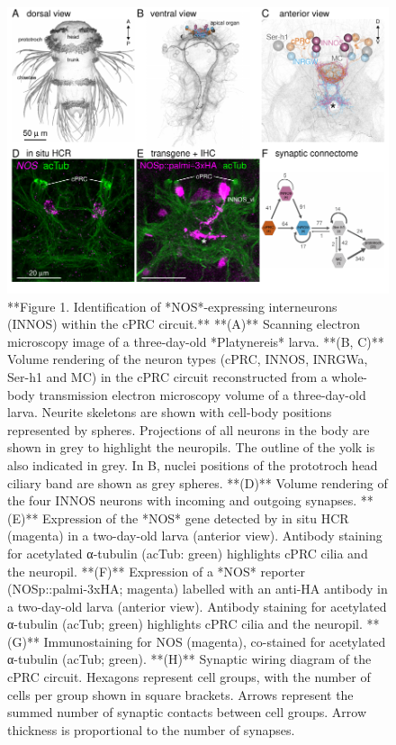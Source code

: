 \documentclass[
  10pt,
  onecolumn]{article}
\begin{document}
\begin{figure}
\includegraphics[width=34.72in]{figures/Fig1} \caption{**Figure 1. Identification of *NOS*-expressing interneurons (INNOS) within the cPRC circuit.** **(A)** Scanning electron microscopy image of a three-day-old *Platynereis* larva. **(B, C)** Volume rendering of the neuron types (cPRC, INNOS, INRGWa, Ser-h1 and MC) in the cPRC circuit reconstructed from a whole-body transmission electron microscopy volume of a three-day-old larva. Neurite skeletons are shown with cell-body positions represented by spheres. Projections of all neurons in the body are shown in grey to highlight the neuropils. The outline of the yolk is also indicated in grey. In B, nuclei positions of the prototroch head ciliary band are shown as grey spheres. **(D)** Volume rendering of the four INNOS neurons with incoming and outgoing synapses. **(E)** Expression of the *NOS* gene detected by in situ HCR (magenta) in a two-day-old larva (anterior view). Antibody staining for acetylated α-tubulin (acTub: green) highlights cPRC cilia and the neuropil. **(F)** Expression of a *NOS* reporter (NOSp::palmi-3xHA; magenta) labelled with an anti-HA antibody in a two-day-old larva (anterior view). Antibody staining for acetylated α-tubulin (acTub; green) highlights cPRC cilia and the neuropil. **(G)** Immunostaining for NOS (magenta), co-stained for acetylated α-tubulin (acTub; green). **(H)** Synaptic wiring diagram of the cPRC circuit. Hexagons represent cell groups, with the number of cells per group shown in square brackets. Arrows represent the summed number of synaptic contacts between cell groups. Arrow thickness is proportional to the number of synapses.}\label{fig:unnamed-chunk-1}
\end{figure}
\end{document}
